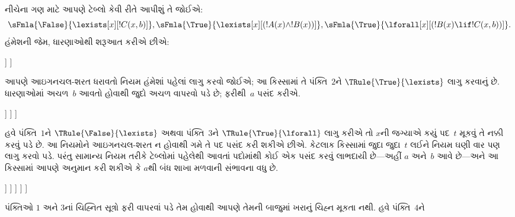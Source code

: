 \begin{ex}
નીચેના ગણ માટે આપણે ટેબ્લો કેવી રીતે આપીશું તે જોઈએ:
\[
\sFmla{\False}{\lexists[x][!C(x,b)]},
\sFmla{\True}{\lexists[x][(!A(x) \land !B(x))]},
\sFmla{\True}{\lforall[x][(!B(x) \lif !C(x,b))]}.
\]
હંમેશની જેમ, ધારણાઓથી શરૂઆત કરીએ છીએ:
\begin{oltableau}
  [\sFmla{\False}{\lexists[x][\formula{C}(x,b)]}, just=\TAss
    [\sFmla{\True}{\lexists[x][(\formula{A}(x) \land \formula{B}(x))]},
      just=\TAss
      [\sFmla{\True}{\lforall[x][(\formula{B}(x) \lif \formula{C}(x,b))]},
        just=\TAss]
    ]
  ]
\end{oltableau}
આપણે આઇગનચલ-શરત ધરાવતો નિયમ હંમેશાં પહેલાં લાગુ કરવો જોઈએ; આ કિસ્સામાં
તે પંક્તિ~$2$ને $\TRule{\True}{\lexists}$ લાગુ કરવાનું છે. ધારણાઓમાં
અચળ~$b$ આવતો હોવાથી જુદો અચળ વાપરવો પડે છે; ફરીથી~$a$ પસંદ
કરીએ.
\begin{oltableau}
  [\sFmla{\False}{\lexists[x][\formula{C}(x,b)]}, just=\TAss
    [\sFmla{\True}{\lexists[x][(\formula{A}(x) \land \formula{B}(x))]},
      just=\TAss, checked
      [\sFmla{\True}{\lforall[x][(\formula{B}(x) \lif \formula{C}(x,b))]},
        just=\TAss
        [\sFmla{\True}{\formula{A}(a) \land \formula{B}(a)},
          just={\TRule{\True}{\lexists}[2]}]
      ]
    ]
  ]
\end{oltableau}
હવે પંક્તિ~$1$ને $\TRule{\False}{\lexists}$ અથવા પંક્તિ~$3$ને
$\TRule{\True}{\lforall}$ લાગુ કરીએ તો $x$ની જગ્યાએ કયું પદ~$t$ મૂકવું
તે નક્કી કરવું પડે છે. આ નિયમોને આઇગનચલ-શરત ન હોવાથી ગમે તે પદ પસંદ
કરી શકીએ છીએ. કેટલાક કિસ્સામાં જુદા જુદા~$t$ લઈને નિયમ ઘણી વાર પણ
લાગુ કરવો પડે. પરંતુ સામાન્ય નિયમ તરીકે ટેબ્લોમાં પહેલેથી આવતાં
પદોમાંથી કોઈ એક પસંદ કરવું લાભદાયી છે---અહીં $a$ અને~$b$ આવે છે---અને
આ કિસ્સામાં આપણે અનુમાન કરી શકીએ કે $a$થી બંધ શાખા મળવાની સંભાવના વધુ
છે.
\begin{oltableau}
  [\sFmla{\False}{\lexists[x][\formula{C}(x,b)]}, just=\TAss
    [\sFmla{\True}{\lexists[x][(\formula{A}(x) \land \formula{B}(x))]},
      just=\TAss, checked
      [\sFmla{\True}{\lforall[x][(\formula{B}(x) \lif \formula{C}(x,b))]}, just=\TAss
        [\sFmla{\True}{\formula{A}(a) \land \formula{B}(a)}, just={\TRule{\True}{\lexists}[2]}
          [\sFmla{\False}{\formula{C}(a,b)}, just={\TRule{\False}{\lexists}[1]}
            [\sFmla{\True}{\formula{B}(a) \lif \formula{C}(a,b)},
              just={\TRule{\True}{\lforall}[3]}
            ]
          ]
        ]
      ]
    ]
  ]
\end{oltableau}
પંક્તિઓ $1$ અને $3$નાં ચિહ્નિત સૂત્રો ફરી વાપરવાં પડે તેમ હોવાથી
આપણે તેમની બાજુમાં ખરાનું ચિહ્ન મૂકતા નથી. હવે પંક્તિ~$4$ને

\end{ex}

